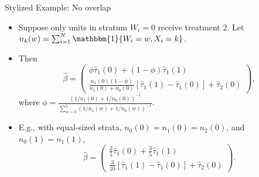 \documentclass[notes,11pt, aspectratio=169]{beamer}
\newcommand\1{\operatorname{\mathbbm{1}}\indicatorfence}
\begin{document}
\begin{frame}{Stylized Example: No overlap}
  \begin{itemize}
  \item Suppose only units in stratum $W_{i}=0$ receive treatment $2$. Let
    $n_{k}(w)=\sum_{i=1}^{N}\1{W_{i}=w,X_{i}=k}$.
  \item Then
    \begin{equation*}
      \hat{\beta}
      =
  \begin{pmatrix}
    \phi\hat{\tau}_{1}(0)+(1-\phi)\hat{\tau}_{1}(1)
    \\
    \frac{n_{1}(0)(1-\phi)}{n_{1}(0)+n_{0}(0)}
    \left[\hat{\tau}_{1}(1)-\hat{\tau}_{1}(0)\right]
    +\hat{\tau}_{2}(0)
  \end{pmatrix},
    \end{equation*}
    where
    $\phi=\frac{(1/n_{1}(0)+1/n_{0}(0))^{-1}}{
      \sum_{w=0}^{1}(1/n_{1}(w)+1/n_{0}(w))^{-1} }$.
  \item E.g., with equal-sized strata, $n_{0}(0)=n_{1}(0)=n_{2}(0)$, and
    $n_{0}(1)=n_{1}(1)$,
    \begin{equation*}
      \hat{\beta}
      =
      \begin{pmatrix}
        \frac{2}{5}\hat{\tau}_{1}(0)+\frac{3}{5}\hat{\tau}_{1}(1)
        \\
        \frac{3}{10}
        \left[\hat{\tau}_{1}(1)-\hat{\tau}_{1}(0)\right]
        +\hat{\tau}_{2}(0)
      \end{pmatrix}.
    \end{equation*}
  \end{itemize}
\end{frame}
\end{document}
